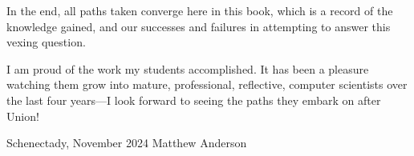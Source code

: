 \begin{changemargin}{0.75in}{0.75in}
In the end, all paths taken converge here in this book, which is a
record of the knowledge gained, and our successes and failures in
attempting to answer this vexing question.

I am proud of the work my students accomplished.  It has been a
pleasure watching them grow into mature, professional, reflective,
computer scientists over the last four years---I look forward to
seeing the paths they embark on after Union!

\bigskip

\noindent Schenectady, November 2024 \hfill Matthew Anderson

\end{changemargin}
